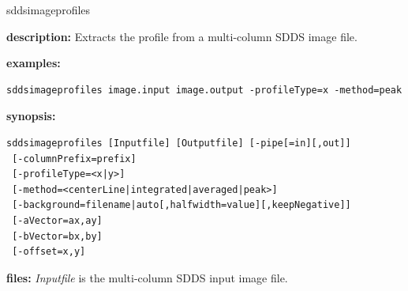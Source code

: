 \begin{sddsprog}{sddsimageprofiles}
  \item \textbf{description:} Extracts the profile from a multi-column SDDS image file.
  \item \textbf{examples:}
    \begin{verbatim}
sddsimageprofiles image.input image.output -profileType=x -method=peak
    \end{verbatim}
  \item \textbf{synopsis:}
    \begin{verbatim}
sddsimageprofiles [Inputfile] [Outputfile] [-pipe[=in][,out]]
 [-columnPrefix=prefix]
 [-profileType=<x|y>]
 [-method=<centerLine|integrated|averaged|peak>]
 [-background=filename|auto[,halfwidth=value][,keepNegative]]
 [-aVector=ax,ay]
 [-bVector=bx,by]
 [-offset=x,y]
    \end{verbatim}
  \item \textbf{files:}
    \emph{Inputfile} is the multi-column SDDS input image file.


\end{sddsprog}
